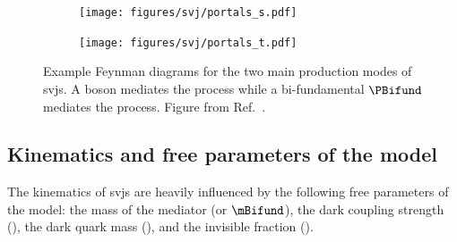 \begin{figure}[htbp]
    \centering
    \begin{subfigure}[c]{0.32\textwidth}
    \centering
        \texttt{[image: figures/svj/portals\_s.pdf]}
        \caption{\schannel}
    \end{subfigure}
    \hspace{0.1\textwidth}
    \begin{subfigure}[c]{0.32\textwidth}
    \centering
        \texttt{[image: figures/svj/portals\_t.pdf]}
        \caption{\tchannel}
    \end{subfigure}
\caption[Example Feynman diagrams for the two main production modes of semi-visible jets. A \PZprime boson mediates the \schannel process while a bi-fundamental $\PBifund$ mediates the \tchannel process]{Example Feynman diagrams for the two main production modes of \glspl{svj}. A \PZprime boson mediates the \schannel process while a bi-fundamental $\PBifund$ mediates the \tchannel process. Figure from Ref.~.}
\label{fig:theory_svj_portals}
\end{figure}




\subsection{Kinematics and free parameters of the model}
\label{subsec:theory_svj_free_params}

The kinematics of \glspl{svj} are heavily influenced by the following free parameters of the model: the mass of the mediator (\mZprime or $\mBifund$), the dark coupling strength (\aDark), the dark quark mass (\mqdark), and the invisible fraction (\rinv).


